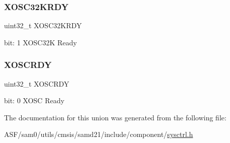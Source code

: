 \subsubsection{\texorpdfstring{XOSC32KRDY}{XOSC32KRDY}}
{\footnotesize\ttfamily uint32\+\_\+t X\+O\+S\+C32\+K\+R\+DY}

bit\+: 1 X\+O\+S\+C32K Ready \mbox{\label{union_s_y_s_c_t_r_l___p_c_l_k_s_r___type_ae3f4eaf046b9b3a9346c0d1d2d91cc06}} 
\subsubsection{\texorpdfstring{XOSCRDY}{XOSCRDY}}
{\footnotesize\ttfamily uint32\+\_\+t X\+O\+S\+C\+R\+DY}

bit\+: 0 X\+O\+SC Ready 

The documentation for this union was generated from the following file\+:\begin{DoxyCompactItemize}
\item 
A\+S\+F/sam0/utils/cmsis/samd21/include/component/\mbox{\hyperlink{component_2sysctrl_8h}{sysctrl.\+h}}\end{DoxyCompactItemize}
